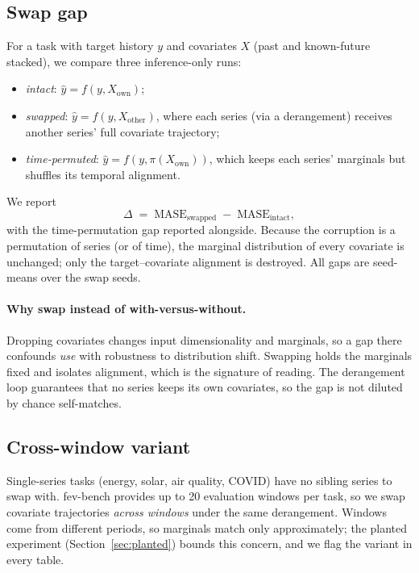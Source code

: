 \documentclass[letterpaper]{article}
\begin{document}
\subsection{Swap gap}
For a task with target history $y$ and covariates $X$ (past and known-future
stacked), we compare three inference-only runs:
\begin{itemize}
\setlength{\itemsep}{0pt}
\item \emph{intact}: $\hat{y} = f(y, X_{\text{own}})$;
\item \emph{swapped}: $\hat{y} = f(y, X_{\text{other}})$, where each series (via a
derangement) receives another series' full covariate trajectory;
\item \emph{time-permuted}: $\hat{y} = f(y, \pi(X_{\text{own}}))$, which keeps each
series' marginals but shuffles its temporal alignment.
\end{itemize}
We report
\begin{equation}
\Delta \;=\; \mathrm{MASE}_{\text{swapped}} \;-\; \mathrm{MASE}_{\text{intact}},
\end{equation}
with the time-permutation gap reported alongside. Because the corruption is a
permutation of series (or of time), the marginal distribution of every covariate is
unchanged; only the target--covariate alignment is destroyed. All gaps are
seed-means over the swap seeds.

\paragraph{Why swap instead of with-versus-without.}
Dropping covariates changes input dimensionality and marginals, so a gap there
confounds \emph{use} with robustness to distribution shift. Swapping holds the
marginals fixed and isolates alignment, which is the signature of reading. The
derangement loop guarantees that no series keeps its own covariates, so the gap is not
diluted by chance self-matches.

\subsection{Cross-window variant}
Single-series tasks (energy, solar, air quality, COVID) have no sibling series to
swap with. fev-bench provides up to 20 evaluation windows per task, so we swap
covariate trajectories \emph{across windows} under the same derangement. Windows come
from different periods, so marginals match only approximately; the planted experiment
(Section~\ref{sec:planted}) bounds this concern, and we flag the variant in every table.
\end{document}
